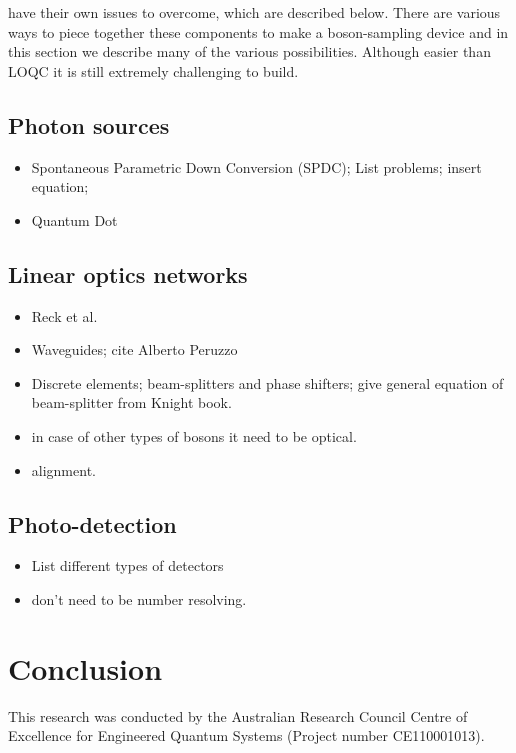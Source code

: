 \documentclass[aps,pra,twocolumn,amsmath,amssymb,nofootinbib,superscriptaddress]{revtex4}
\begin{document}
have their own issues to overcome, which are described below. 
There are various ways to piece together these components to make a boson-sampling device and in this section we describe many of the various possibilities. 
Although easier than LOQC it is still extremely challenging to build.


\subsection{Photon sources}

\begin{itemize}
\item Spontaneous Parametric Down Conversion (SPDC); List problems; insert equation; 
\item Quantum Dot
\end{itemize}

\subsection{Linear optics networks}

\begin{itemize}
\item Reck et al.
\item Waveguides; cite Alberto Peruzzo
\item Discrete elements; beam-splitters and phase shifters; give general equation of beam-splitter from Knight book.
\item in case of other types of bosons it need to be optical.
\item alignment.
\end{itemize}

\subsection{Photo-detection}

\begin{itemize}
\item List different types of detectors
\item don't need to be number resolving.
\end{itemize}

\section{Conclusion}

%
%

\begin{acknowledgments}
This research was conducted by the Australian Research Council Centre of Excellence for Engineered Quantum Systems (Project number CE110001013).
\end{acknowledgments}

%
%


\end{document}
